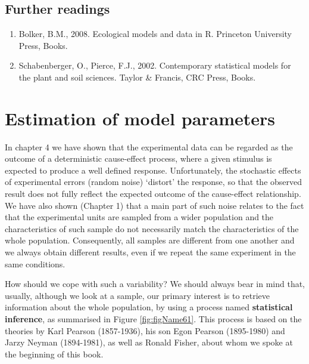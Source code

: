 \documentclass[a4paper,12pt,oneside]{book}
\providecommand{\tightlist}{%
  \setlength{\itemsep}{0pt}\setlength{\parskip}{0pt}}
\begin{document}
\hypertarget{further-readings-2}{%
\section{Further readings}\label{further-readings-2}}

\begin{enumerate}
\def\labelenumi{\arabic{enumi}.}
\tightlist
\item
  Bolker, B.M., 2008. Ecological models and data in R. Princeton University Press, Books.
\item
  Schabenberger, O., Pierce, F.J., 2002. Contemporary statistical models for the plant and soil sciences. Taylor \& Francis, CRC Press, Books.
\end{enumerate}

\hypertarget{estimation-of-model-parameters}{%
\chapter{Estimation of model parameters}\label{estimation-of-model-parameters}}

In chapter 4 we have shown that the experimental data can be regarded as the outcome of a deterministic cause-effect process, where a given stimulus is expected to produce a well defined response. Unfortunately, the stochastic effects of experimental errors (random noise) `distort' the response, so that the observed result does not fully reflect the expected outcome of the cause-effect relationship. We have also shown (Chapter 1) that a main part of such noise relates to the fact that the experimental units are sampled from a wider population and the characteristics of such sample do not necessarily match the characteristics of the whole population. Consequently, all samples are different from one another and we always obtain different results, even if we repeat the same experiment in the same conditions.

How should we cope with such a variability? We should always bear in mind that, usually, although we look at a sample, our primary interest is to retrieve information about the whole population, by using a process named \textbf{statistical inference}, as summarised in Figure \ref{fig:figName61}. This process is based on the theories by Karl Pearson (1857-1936), his son Egon Pearson (1895-1980) and Jarzy Neyman (1894-1981), as well as Ronald Fisher, about whom we spoke at the beginning of this book.
\end{document}
